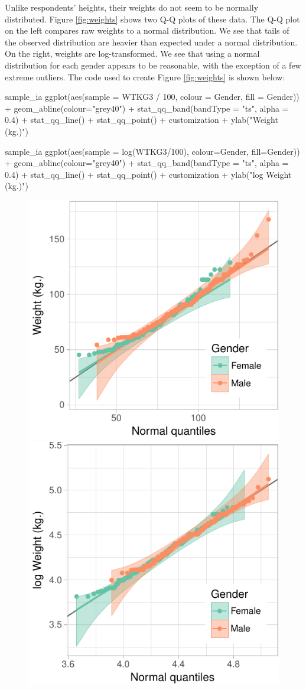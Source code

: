 Unlike respondents' heights, their weights do not seem to be normally
distributed. Figure \ref{fig:weights} shows two Q-Q plots of these data.
The Q-Q plot on the left compares raw weights to a normal distribution.
We see that tails of the observed distribution are heavier than expected
under a normal distribution. On the right, weights are log-transformed.
We see that using a normal distribution for each gender appears to be
reasonable, with the exception of a few extreme outliers. The code used
to create Figure \ref{fig:weights} is shown below:

\begin{Schunk}
\begin{Sinput}
sample_ia %
  ggplot(aes(sample = WTKG3 / 100, colour = Gender, fill = Gender)) + 
  geom_abline(colour="grey40") +
  stat_qq_band(bandType = "ts", alpha = 0.4) + 
  stat_qq_line() + 
  stat_qq_point() +
  customization +
  ylab("Weight (kg.)")

sample_ia %
  ggplot(aes(sample = log(WTKG3/100), colour=Gender, fill=Gender)) + 
  geom_abline(colour="grey40") +
  stat_qq_band(bandType = "ts", alpha = 0.4) + 
  stat_qq_line() + 
  stat_qq_point() +
  customization +
  ylab("log Weight (kg.)")
\end{Sinput}
\begin{figure}

{\centering \includegraphics[width=0.4\linewidth]{loy-figures/weights-1} \includegraphics[width=0.4\linewidth]{loy-figures/weights-2} 

}
\end{figure}
\end{Schunk}
